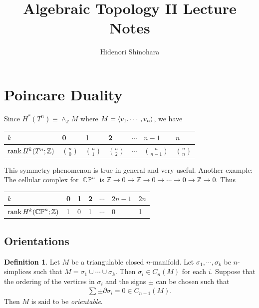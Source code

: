 \documentclass[psamsfonts]{amsart}
\theoremstyle{definition}
\newtheorem{defn}[thm]{Definition}
\theoremstyle{rem}
\DeclareMathOperator{\CP}{\mathbb{C}\mathbb{P}}
\numberwithin{equation}{section}
\begin{document}
\title{Algebraic Topology II Lecture Notes}
\author{Hidenori Shinohara}

\maketitle
\tableofcontents

\section{Poincare Duality}

Since $H^{\ast}(T^n) \equiv \wedge_{\mathbb{Z}} M$ where $M = \ev{ v_1, \cdots, v_n }$, we have

\begin{center}
  \begin{tabular}{| l | l | l | l | l | l | l |} \hline
    $k$                          & 0 & 1 & 2 & $\cdots$ & $n - 1$  & $n$ \\ \hline
    $\rank H^k(T^n; \mathbb{Z})$ & $\binom{n}{0}$ & $\binom{n}{1}$ & $\binom{n}{2}$ & $\cdots$ & $\binom{n}{n - 1}$ & $\binom{n}{n}$ \\ \hline
  \end{tabular}
\end{center}

This symmetry phenomenon is true in general and very useful.
Another example: The cellular complex for $\CP^n$ is $\mathbb{Z} \rightarrow 0 \rightarrow \mathbb{Z} \rightarrow 0 \rightarrow \cdots \rightarrow 0 \rightarrow \mathbb{Z} \rightarrow 0$.
Thus

\begin{center}
  \begin{tabular}{| l | l | l | l | l | l | l |} \hline
    $k$                          & 0 & 1 & 2 & $\cdots$ & $2n - 1$  & $2n$ \\ \hline
    $\rank H^k(\CP^n; \mathbb{Z})$ & 1 & 0 & 1 & $\cdots$ & 0         & 1 \\
    \hline
  \end{tabular}
\end{center}

\subsection{Orientations}

\begin{defn}
  Let $M$ be a triangulable closed $n$-manifold.
  Let $\sigma_1, \cdots, \sigma_k$ be $n$-simplices such that $M = \sigma_1 \cup \cdots \cup \sigma_k$.
  Then $\sigma_i \in C_n(M)$ for each $i$.
  Suppose that the ordering of the vertices in $\sigma_i$ and the signs $\pm$ can be chosen such that
  \begin{align*}
    \sum \pm \partial \sigma_i = 0 \in C_{n - 1}(M).
  \end{align*}
  Then $M$ is said to be \textit{orientable}.
\end{defn}
\end{document}
